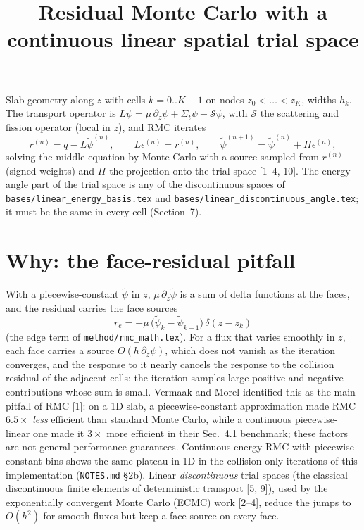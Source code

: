 \documentclass[11pt]{article}
\title{Residual Monte Carlo with a continuous linear spatial trial space}
\date{}
\newcommand{\tpsi}{\tilde\psi}
\newcommand{\Sigt}{\Sigma_t}
\begin{document}
\maketitle

\noindent Slab geometry along $z$ with cells $k=0..K-1$ on nodes $z_0<\dots<z_K$,
widths $h_k$. The transport operator is
$L\psi = \mu\,\partial_z\psi + \Sigt\psi - \mathcal S\psi$, with $\mathcal S$ the
scattering and fission operator (local in $z$), and RMC iterates
\begin{equation}
  r^{(n)} = q - L\tpsi^{(n)},\qquad L\epsilon^{(n)} = r^{(n)},\qquad
  \tpsi^{(n+1)} = \tpsi^{(n)} + \Pi\epsilon^{(n)},
\end{equation}
solving the middle equation by Monte Carlo with a source sampled from $r^{(n)}$ (signed
weights) and $\Pi$ the projection onto the trial space [1--4, 10]. The energy-angle part
of the trial space is any of the discontinuous spaces of
\texttt{bases/linear\_energy\_basis.tex} and \texttt{bases/linear\_discontinuous\_angle.tex}; it
must be the same in every cell (Section~7).

\section{Why: the face-residual pitfall}

With a piecewise-constant $\tpsi$ in $z$, $\mu\,\partial_z\tpsi$ is a sum of delta
functions at the faces, and the residual carries the face sources
\begin{equation}
  r_e = -\mu\,\big(\tpsi_{k}-\tpsi_{k-1}\big)\,\delta(z-z_k)
\end{equation}
(the edge term of \texttt{method/rmc\_math.tex}). For a flux that varies smoothly in $z$, each
face carries a source $O(h\,\partial_z\psi)$, which does not vanish as the iteration
converges, and the response to it nearly cancels the response to the collision residual
of the adjacent cells: the iteration samples large positive and negative contributions
whose sum is small. Vermaak and Morel identified this as the main pitfall of RMC [1]:
on a 1D slab, a piecewise-constant approximation made RMC $6.5\times$ \emph{less}
efficient than standard Monte Carlo, while a continuous piecewise-linear one made it
$3\times$ more efficient in their Sec.~4.1 benchmark; these factors are not general
performance guarantees. Continuous-energy RMC with piecewise-constant bins shows the same
plateau in 1D in the collision-only iterations of this implementation
(\texttt{NOTES.md} \S2b). Linear \emph{discontinuous} trial spaces (the classical discontinuous
finite elements of deterministic transport [5, 9]), used by the exponentially
convergent Monte Carlo (ECMC) work [2--4], reduce the jumps to
$O(h^2)$ for smooth fluxes but keep a face source on every face.
\end{document}
